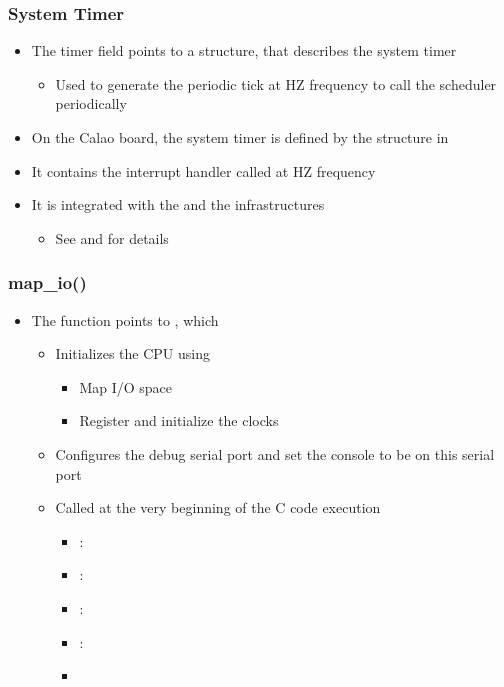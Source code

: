 \begin{frame}
  \frametitle{System Timer}
  \begin{itemize}
  \item The timer field points to a  structure,
    that describes the system timer
    \begin{itemize}
    \item Used to generate the periodic tick at HZ frequency to call
      the scheduler periodically
    \end{itemize}
  \item On the Calao board, the system timer is defined by the
     structure in 
  \item It contains the interrupt handler called at HZ frequency
  \item It is integrated with the  and the
     infrastructures
    \begin{itemize}
    \item See  and
       for details
    \end{itemize}
  \end{itemize}
\end{frame}

\begin{frame}
  \frametitle{map\_io()}
  \begin{itemize}
  \item The  function points to ,
    which
    \begin{itemize}
    \item Initializes the CPU using 
      \begin{itemize}
      \item Map I/O space
      \item Register and initialize the clocks
      \end{itemize}
    \item Configures the debug serial port and set the console to be
      on this serial port
    \item Called at the very beginning of the C code execution
      \begin{itemize}
      \item {}: 
      \item {}: 
      \item {}: 
      \item {}: 
      \item {}
      \end{itemize}
    \end{itemize}
  \end{itemize}
\end{frame}

